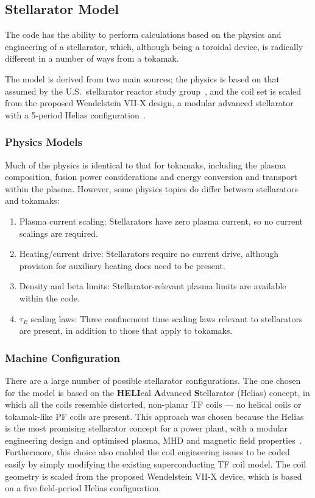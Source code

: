\subsection{Stellarator Model}
The code has the ability to perform calculations based on the physics and
engineering of a stellarator, which, although being a toroidal device, is
radically different in a number of ways from a tokamak.

The model is derived from two main sources; the physics is based on that
assumed by the U.S.\ stellarator reactor study group~\cite{USSRSG}, and the
coil set is scaled from the proposed Wendelstein VII-X design, a modular
advanced stellarator with a 5-period Helias configuration~\cite{W7X}.

\subsubsection{Physics Models}
Much of the physics is identical to that for tokamaks, including the plasma
composition, fusion power considerations and energy conversion and transport
within the plasma. However, some physics topics do differ between stellarators
and tokamaks:
\begin{enumerate}
\item Plasma current scaling: Stellarators have zero plasma current, so no
current scalings are required.
\item Heating/current drive: Stellarators require no current drive, although
provision for auxiliary heating does need to be present.
\item Density and beta limits: Stellarator-relevant plasma limits are
available within the code.
\item $\tau_E$ scaling laws: Three confinement time scaling laws
relevant to stellarators are present, in addition to those that apply to
tokamaks.
\end{enumerate}

\subsubsection{Machine Configuration}
There are a large number of possible stellarator configurations. The one
chosen for the \PS model is based on the {\bf HELI}cal {\bf A}dvanced {\bf
S}tellarator (Helias) concept, in which all the coils resemble distorted,
non-planar TF coils --- no helical coils or tokamak-like PF coils are present.
This approach was chosen because the Helias is the most promising stellarator
concept for a power plant, with a modular engineering design and optimised
plasma, MHD and magnetic field properties~\cite{HSR}. Furthermore, this choice
also enabled the coil engineering issues to be coded easily by simply
modifying the existing \PS superconducting TF coil model. The coil geometry is
scaled from the proposed Wendelstein VII-X device, which is based on a five
field-period Helias configuration.

